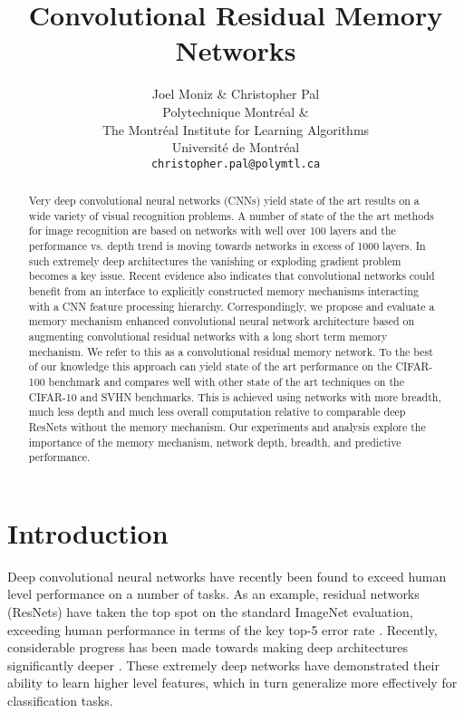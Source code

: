 \documentclass{article}
\title{Convolutional Residual Memory Networks}
\author{
  Joel Moniz \& Christopher Pal \\
  Polytechnique Montréal \& \\
  The Montréal Institute for Learning Algorithms\\
  Université de Montréal \\
  \texttt{christopher.pal@polymtl.ca} \\
}
\begin{document}

\maketitle

\begin{abstract}
Very deep convolutional neural networks (CNNs) yield state of the art results on a wide variety of visual recognition problems. A number of state of the the art methods for image recognition are based on networks with well over 100 layers and the performance vs. depth trend is moving towards networks in excess of 1000 layers. In such extremely deep architectures the vanishing or exploding gradient problem becomes a key issue. Recent evidence also indicates that convolutional networks could benefit from an interface to explicitly constructed memory mechanisms interacting with a CNN feature processing hierarchy. Correspondingly, we propose and evaluate a memory mechanism enhanced convolutional neural network architecture based on augmenting convolutional residual networks with a long short term memory mechanism. We refer to this as a convolutional residual memory network. To the best of our knowledge this approach can yield state of the art performance on the CIFAR-100 benchmark and compares well with other state of the art techniques on the CIFAR-10 and SVHN benchmarks. This is achieved using networks with more breadth, much less depth and much less overall computation relative to comparable deep ResNets without the memory mechanism. Our experiments and analysis explore the importance of the memory mechanism, network depth, breadth, and predictive performance. 
%
\end{abstract}

\section{Introduction}

Deep convolutional neural networks have recently been found to exceed human level performance on a number of tasks. As an example, residual networks (ResNets) have taken the top spot on the standard ImageNet evaluation, exceeding human performance in terms of the key top-5 error rate \cite{he2015deep}.
%
Recently, considerable progress has been made towards making deep architectures significantly deeper \cite{simonyan2014very, szegedy2015going, srivastava2015training, he2015deep, he2016identity}. %
These extremely deep networks have demonstrated their ability to learn higher level features, which in turn generalize more effectively for classification tasks. 
\end{document}
